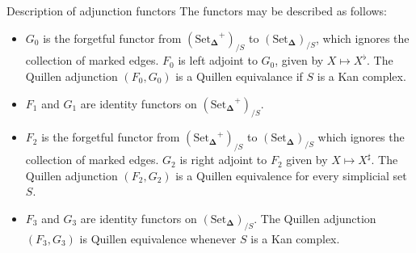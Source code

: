 \documentclass{beamer}[9pt]
\newcommand{\8}{\ensuremath{\infty}}
\newcommand{\SSet}{\ensuremath{\text{Set}_{\boldsymbol{\Delta}}}}
\begin{document}
\begin{frame}{Description of adjunction functors}
  The functors may be described as follows:

  \begin{itemize}
    \item<1->[(A0)] $G_0$ is the forgetful functor from $(\SSet^+)_{/S}$ to $(\SSet)_{/S}$, which ignores the collection of marked edges. $F_0$ is left adjoint to $G_0$, given by $X \mapsto X^\flat$. The Quillen adjunction $(F_0, G_0)$ is a Quillen equivalance if $S$ is a Kan complex.
    \item<2->[(A1)] $F_1$ and $G_1$ are identity functors on $(\SSet^+)_{/S}$.
    \item<3->[(A2)]  $F_2$ is the forgetful functor from $(\SSet^+)_{/S}$ to $(\SSet)_{/S}$ which ignores the collection of marked edges. $G_2$ is right adjoint to $F_2$ given by $X \mapsto X^\sharp$. The Quillen adjunction $(F_2, G_2)$ is a Quillen equivalence for every simplicial set $S$.
    \item<4>[(A3)]  $F_3$ and $G_3$ are identity functors on $(\SSet)_{/S}$. The Quillen adjunction $(F_3, G_3)$ is Quillen equivalence whenever $S$ is a Kan complex.
  \end{itemize}
\end{frame}
\end{document}

